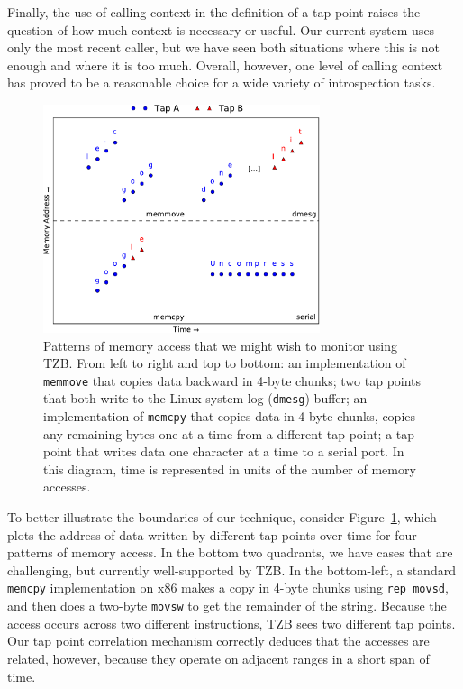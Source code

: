 Finally, the use of calling context in the definition of a tap point
raises the question of how much context is necessary or useful. Our
current system uses only the most recent caller, but we have seen
both situations where this is not enough and where it is too much.
Overall, however, one level of calling context has proved to be a
reasonable choice for a wide variety of introspection tasks.

\begin{figure}[t]
    \begin{center}
        \includegraphics[width=3.2in]{figures/memaccess.pdf}
    \end{center}
    \caption{Patterns of memory access that we might wish to monitor
    using TZB. From left to right and top to bottom: an implementation
    of \texttt{memmove} that copies data backward in 4-byte chunks; two
    tap points that both write to the Linux system log (\texttt{dmesg})
    buffer; an implementation of \texttt{memcpy} that copies data in
    4-byte chunks, copies any remaining bytes one at a time from a
    different tap point; a tap point that writes data one character at
    a time to a serial port. In this diagram, time is represented in
    units of the number of memory accesses.}
    \label{fig:memaccess}
\end{figure}

To better illustrate the boundaries of our technique, consider
Figure~\ref{fig:memaccess}, which plots the address of data written by
different tap points over time for four patterns of memory access. In
the bottom two quadrants, we have cases that are challenging, but
currently well-supported by TZB. In the bottom-left, a standard
\texttt{memcpy} implementation on x86 makes a copy in 4-byte chunks
using \texttt{rep movsd}, and then does a two-byte \texttt{movsw} to get
the remainder of the string. Because the access occurs across two
different instructions, TZB sees two different tap points. Our tap point
correlation mechanism correctly deduces that the accesses are related,
however, because they operate on adjacent ranges in a short span of
time.

